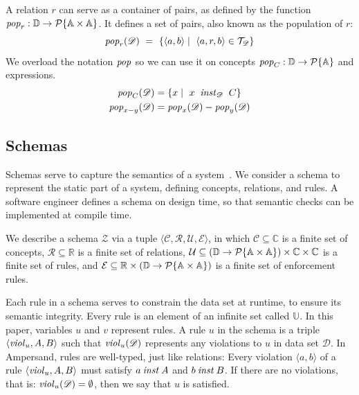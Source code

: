 \documentclass[runningheads]{llncs}
\newcommand{\id}[1]{\text{\it #1\/}}
\newcommand{\popF}[1]{\id{pop}_{#1}}
\newcommand{\pop}[2]{\popF{#1}(#2)}
\newcommand{\instance}{\mathbin{\id{inst}}}
\newcommand{\viol}[2]{\violC{#1}(#2)}
\newcommand{\violC}[1]{\id{viol}_{#1}}
\newcommand{\powerset}[1]{\cal{P}\{#1\}}
\newcommand{\declare}[3]{\id{#1}_{\pair{#2}{#3}}}
\newcommand{\pair}[2]{\langle{#1},{#2}\rangle}
\newcommand{\Pair}[2]{#1\times#2}
\newcommand{\triple}[3]{\langle{#1},{#2},{#3}\rangle}
\newcommand{\quadruple}[4]{\langle{#1},{#2},{#3},{#4}\rangle}
\newcommand{\Atoms}{\mathbb{A}}
\newcommand{\concepts}{\mathcal{C}}
\newcommand{\Concepts}{\mathbb{C}}
\newcommand{\rels}{\mathcal{R}}   %
\newcommand{\Rels}{\mathbb{R}}   %
\newcommand{\triples}{\mathcal{T}}
\newcommand{\Triple}[3]{#1\times#2\times#3}
\newcommand{\enforces}{\mathcal{E}}
\newcommand{\rules}{\mathcal{U}}
\newcommand{\Rules}{\mathbb{U}}
\newcommand{\dataset}{\mathscr{D}}
\newcommand{\Dataset}{\mathbb{D}}
\newcommand{\schema}{\mathscr{Z}}
\begin{document}
   A relation $r$ can serve as a container of pairs,
   as defined by the function $\popF{r}:\Dataset\rightarrow\powerset{\Pair{\Atoms}{\Atoms}}$.
   It defines a set of pairs, also known as the population of $r$:
\begin{equation}
   \pop{r}{\dataset}\ =\ \{ \pair{a}{b}\mid\ \triple{a}{r}{b}\in\triples_{\dataset}\}
\label{eqn:pop-rel}
\end{equation}
%
   We overload the notation $\popF{}$ so we can use it on concepts $\popF{C}:\Dataset\rightarrow\powerset{\Atoms}$
   and expressions.
\begin{align}
   \pop{C}{\dataset}&= \{ x\mid\ x\ \instance_{\dataset}\ C\}
\label{eqn:pop-concept}\\
   \pop{x-y}{\dataset}&= \pop{x}{\dataset} - \pop{y}{\dataset}
\label{eqn:pop-expr}
\end{align}

\subsection{Schemas}
\label{sct:Schemas}
   Schemas serve to capture the semantics of a system~\cite{Spivak2012}.
   We consider a schema to represent the static part of a system, defining concepts, relations, and rules.
   A software engineer defines a schema on design time, so that semantic checks can be implemented at compile time.

   We describe a schema $\schema$ via a tuple $\quadruple{\concepts}{\rels}{\rules}{\enforces}$,
   in which $\concepts\subseteq \Concepts$ is a finite set of concepts,
   $\rels\subseteq \Rels$ is a finite set of relations,
   $\rules\subseteq \Triple{(\Dataset \to \powerset{\Pair{\Atoms}{\Atoms}})}{\Concepts}{\Concepts}$ is a finite set of rules,
   and $\enforces\subseteq \Pair{\Rels}{\left(\Dataset \to \powerset{\Pair{\Atoms}{\Atoms}}\right)}$ is a finite set of enforcement rules.
   
   Each rule in a schema serves to constrain the data set at runtime, to ensure its semantic integrity.
   Every rule is an element of an infinite set called $\Rules$.
   In this paper, variables $u$ and $v$ represent rules.
   A rule $u$ in the schema is a triple $\triple{\violC{u}}{A}{B}$ such that $\viol{u}{\dataset}$ represents any violations to $u$ in data set $\dataset$.
   In Ampersand, rules are well-typed, just like relations:
   Every violation $\pair{a}{b}$ of a rule $\triple{\violC{u}}{A}{B}$ must satisfy $a\instance A$ and $b\instance B$.
   If there are no violations, that is: $\viol{u}{\dataset} = \emptyset{}$, then we say that $u$ is satisfied.
   
\end{document}
